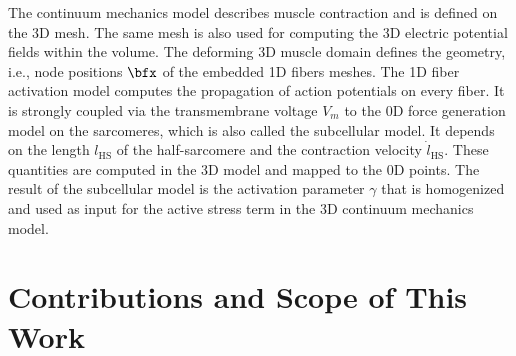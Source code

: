 The continuum mechanics model describes muscle contraction and is defined on the 3D mesh. The same mesh is also used for computing the 3D electric potential fields within the volume. The deforming 3D muscle domain defines the geometry, i.e., node positions $\bfx$ of the embedded 1D fibers meshes. The 1D fiber activation model computes the propagation of action potentials on every fiber. It is strongly coupled via the transmembrane voltage $V_m$ to the 0D force generation model on the sarcomeres, which is also called the subcellular model. It depends on the length $l_\text{HS}$ of the half-sarcomere and the contraction velocity $\dot{l}_\text{HS}$. These quantities are computed in the 3D model and mapped to the 0D points. The result of the subcellular model is the activation parameter $\gamma$ that is homogenized and used as input for the active stress term in the 3D continuum mechanics model.

\section{Contributions and Scope of This Work}\label{sec:intro_contributions}

